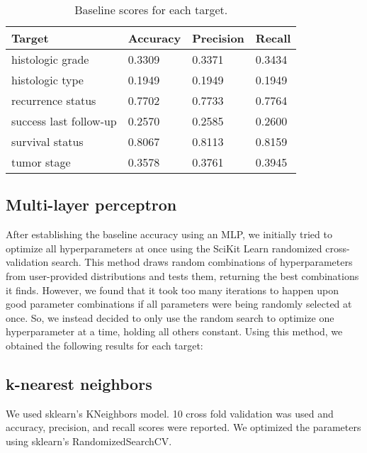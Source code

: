 \documentclass{article}
\begin{document}
\bigskip

\begin{table}[H]
\begin{center}
\begin{tabular}{ *{4}{l} }
    \multicolumn{1}{p{1.5cm}}{\raggedright Target} &  
    \multicolumn{1}{p{1.5cm}}{\raggedright Accuracy} &  
    \multicolumn{1}{p{1.5cm}}{\raggedright Precision} &  
    \multicolumn{1}{p{1.5cm}}{\raggedright Recall} \\ \hline \hline
histologic grade       &         0.3309 &          0.3371 &       0.3434 \\ \hline
histologic type        &         0.1949 &          0.1949 &       0.1949 \\ \hline
recurrence status      &         0.7702 &          0.7733 &       0.7764 \\ \hline
success last follow-up &         0.2570 &          0.2585 &       0.2600 \\ \hline
survival status        &         0.8067 &          0.8113 &       0.8159 \\ \hline
tumor stage            &         0.3578 &          0.3761 &       0.3945 \\ \hline
\end{tabular}
\caption{Baseline scores for each target.}
\end{center}
\end{table}

\subsection{Multi-layer perceptron}

After establishing the baseline accuracy using an MLP, we initially tried to optimize all hyperparameters at once using the SciKit Learn randomized cross-validation search. This method draws random combinations of hyperparameters from user-provided distributions and tests them, returning the best combinations it finds. However, we found that it took too many iterations to happen upon good parameter combinations if all parameters were being randomly selected at once. So, we instead decided to only use the random search to optimize one hyperparameter at a time, holding all others constant. Using this method, we obtained the following results for each target:

\subsection{k-nearest neighbors}
We used sklearn's KNeighbors model. 10 cross fold validation was used and accuracy, precision, and recall scores were reported. 
We optimized the parameters using sklearn's RandomizedSearchCV.
\end{document}
